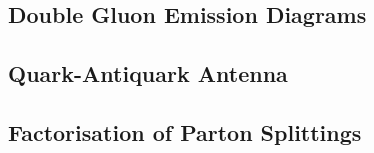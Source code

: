 \documentclass[12pt]{article}
\begin{document}
\newpage



\subsection{Double Gluon Emission Diagrams}


\begin{center}
	
\newlength{\imagew}\setlength{\imagew}{10.50cm}
\newlength{\imageh}\setlength{\imageh}{4.00cm}









\end{center}



\newpage


\subsection{Quark-Antiquark Antenna}

\begin{center}
	




\end{center}



\subsection{Factorisation of Parton Splittings}

\begin{center}




	
\end{center}
\end{document}

